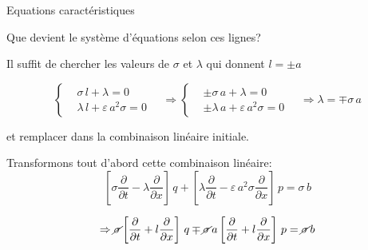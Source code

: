 \documentclass[
mode=present,    %
paper=a4paper,   %
orient=landscape,
display=slides,   %
size=10pt,
style=romain   %
]{powerdot}
\begin{document}
\begin{slide}[toc=Equ. caractéristiques]{Equations caractéristiques}

Que devient le système d'équations selon ces lignes?

Il suffit de chercher les valeurs de $\sigma$ et $\lambda$ qui donnent $l=\pm a$

\begin{equation*}
    \left\{
    \begin{aligned}
        & \sigma\,l+\lambda = 0   \\
        & \lambda\,l +\varepsilon\, a^2 \sigma = 0
    \end{aligned}
    \right.
    \quad \Rightarrow
        \left\{
    \begin{aligned}
        & \pm \sigma\,a+\lambda = 0   \\
        & \pm \lambda\,a +\varepsilon\, a^2 \sigma = 0
    \end{aligned}
    \right.
    \quad \Rightarrow \lambda = \mp \sigma\, a
\end{equation*}

et remplacer dans la combinaison linéaire initiale.

\bigskip

Transformons tout d'abord cette combinaison linéaire:
        \begin{equation*}
\left[ \sigma \frac{\partial}{\partial t} - \lambda \frac{\partial}{\partial x}  \right]\, q
 +
\left[ \lambda \frac{\partial}{\partial t} -\varepsilon\, a^2 \sigma \frac{\partial}{\partial x}  \right]\, p = \sigma\, b
        \end{equation*}

        \begin{equation*}
\Rightarrow \cancel{\sigma} \left[ \frac{\partial}{\partial t} + l \frac{\partial}{\partial x}  \right]\, q
\mp \cancel{\sigma}\, a \left[ \frac{\partial}{\partial t} + l \frac{\partial}{\partial x}  \right]\, p = \cancel{\sigma}\, b
        \end{equation*}

\end{slide}
\end{document}
